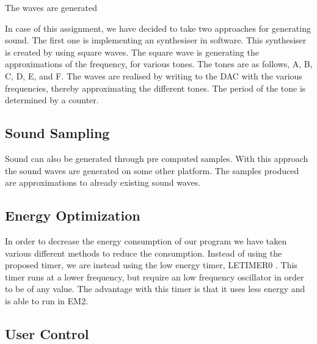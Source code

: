 The waves are generated  


In case of this assignment, we have decided to take two approaches for generating sound. The first one is implementing an synthesiser in software. This synthesiser is created by using square waves. The square wave is generating the approximations of the frequency, for various tones. The tones are as follows, A, B, C, D, E, and F. The waves are realised by writing to the DAC with the various frequencies, thereby approximating the different tones. The period of the tone is determined by a counter.

\subsection{Sound Sampling}
Sound can also be generated through pre computed samples. With this approach the sound waves are generated on some other platform. The samples produced are approximations to already existing sound waves.


\subsection{Energy Optimization}
In order to decrease the energy consumption of our program we have taken various different methods to reduce the consumption. Instead of using the proposed timer\cite{compendium}, we are instead using the low energy timer, LETIMER0 \cite{EFM32GG-rm}. This timer runs at a lower frequency, but require an low frequency oscillator in order to be of any value. The advantage with this timer is that it uses less energy and is able to run in EM2.  



\subsection{User Control}













